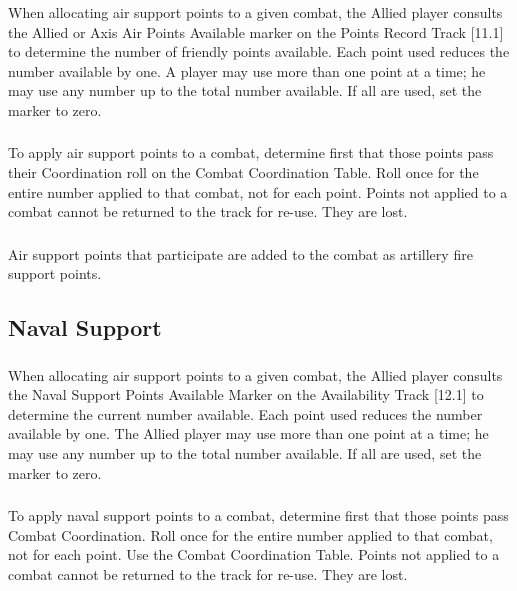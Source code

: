 \subsubsection{}
When allocating air support points to a given combat, the Allied player consults the Allied or Axis Air Points Available marker on the Points Record Track [11.1] to determine the number of friendly points available. Each point used reduces the number available by one. A player may use more than one point at a time; he may use any number up to the total number available. If all are used, set the marker to zero.

\subsubsection{}
To apply air support points to a combat, determine first that those points pass their Coordination roll on the Combat Coordination Table. Roll once for the entire number applied to that combat, not for each point. Points not applied to a combat cannot be returned to the track for re-use. They are lost.

\subsubsection{}
Air support points that participate are added to the combat as artillery fire support points.

\subsection{Naval Support}

\subsubsection{}
When allocating air support points to a given combat, the Allied player consults the Naval Support Points Available Marker on the Availability Track [12.1] to determine the current number available. Each point used reduces the number available by one. The Allied player may use more than one point at a time; he may use any number up to the total number available. If all are used, set the marker to zero.

\subsubsection{}
To apply naval support points to a combat, determine first that those points pass Combat Coordination. Roll once for the entire number applied to that combat, not for each point. Use the Combat Coordination Table. Points not applied to a combat cannot be returned to the track for re-use. They are lost.

